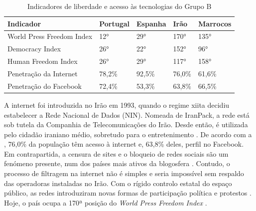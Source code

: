 \documentclass{textolivre}
\begin{document}
\begin{table}[htpb]
\centering
\begin{threeparttable}
\caption{Indicadores de liberdade e acesso às tecnologias do Grupo B
}
\label{tab1}
\begin{tabular}{lllll}
\toprule
Indicador & Portugal & Espanha & Irão & Marrocos
\\
\midrule
World Press Freedom Index\tnote{a} & 12° & 29° & 170° & 135°
\\
Democracy Index\tnote{b} & 26° & 22° & 152° & 96°
\\
Human Freedom Index\tnote{c} & 26° & 29° & 117° & 158°
\\
Penetração da Internet\tnote{d} & 78,2\% & 92,5\% & 76,0\% & 61,6\%
\\
Penetração do Facebook\tnote{d} & 72,4\% & 53,3\% & 63,8\% & 66,5\%
\\
\bottomrule
\end{tabular}
\centering
{}
\end{threeparttable}
\end{table}

A internet foi introduzida no Irão em 1993, quando o regime xiita decidiu estabelecer a Rede Nacional de Dados (NIN). Nomeada de IranPack, a rede está sob tutela da Companhia de Telecomunicações do Irão. Desde então, é utilizada pelo cidadão iraniano médio, sobretudo para o entretenimento \cite{shoraka2002}. De acordo com a \textcite{internet2018}, 76,0\% da população têm acesso à internet e, 63,8\% deles, perfil no Facebook. Em contrapartida, a censura de sites e o bloqueio de redes sociais são um fenómeno presente, num dos países mais ativos da blogosfera \cite{sreberny2010}. Contudo, o processo de filtragem na internet não é simples e seria impossível sem respaldo das operadoras instaladas no Irão. Com o rígido controlo estatal do espaço público, as redes introduziram novas formas de participação política e protestos \cite{rahimi2011, di_fatima2019}. Hoje, o país ocupa a 170ª posição do \emph{World Press Freedom Index} \cite{reporteres2019}.
\end{document}
